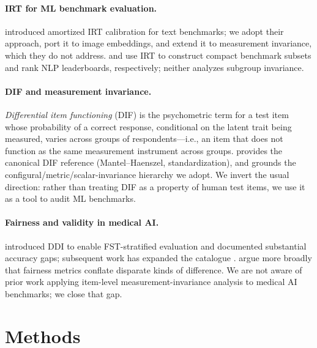 \documentclass{article}
\begin{document}
\paragraph{IRT for ML benchmark evaluation.}
\citet{truong2025reliableefficientamortizedmodelbased} introduced amortized IRT calibration for text benchmarks; we adopt their approach, port it to image embeddings, and extend it to measurement invariance, which they do not address. \citet{polo2024tinybenchmarks} and \citet{rodriguez-etal-2021-evaluation} use IRT to construct compact benchmark subsets and rank NLP leaderboards, respectively; neither analyzes subgroup invariance.

\paragraph{DIF and measurement invariance.}
\emph{Differential item functioning} (DIF) is the psychometric term for a test item whose probability of a correct response, conditional on the latent trait being measured, varies across groups of respondents---i.e., an item that does not function as the same measurement instrument across groups. \citet{holland1993differential} provides the canonical DIF reference (Mantel--Haenszel, standardization), and \citet{millsap2011statistical} grounds the configural/metric/scalar-invariance hierarchy we adopt. We invert the usual direction: rather than treating DIF as a property of human test items, we use it as a tool to audit ML benchmarks.

\paragraph{Fairness and validity in medical AI.}
\citet{daneshjou2022disparities} introduced DDI to enable FST-stratified evaluation and documented substantial accuracy gaps; subsequent work has expanded the catalogue \citep{groh2021evaluating}. \citet{wang2025differenceaware} argue more broadly that fairness metrics conflate disparate kinds of difference. We are not aware of prior work applying item-level measurement-invariance analysis to medical AI benchmarks; we close that gap.

\section{Methods}
\label{sec:methods}
\end{document}
